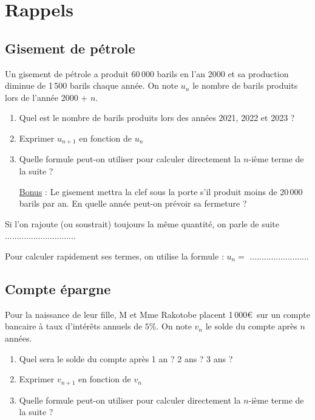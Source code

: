 \documentclass[oneside,12pt]{article}          %
\begin{document}
\section{Rappels}

\subsection{Gisement de pétrole}
Un gisement de pétrole a produit 60\,000 barils en l'an 2000 et sa production diminue de 1\,500 barils chaque année. On note $u_n$ le nombre de barils produits lors de l'année 2000 + $n$.
\begin{enumerate}[align = left]
	\item Quel est le nombre de barils produits lors des années 2021, 2022 et 2023 ?
	\item Exprimer $u_{n+1}$ en fonction de $u_n$
	\item Quelle formule peut-on utiliser pour calculer directement la $n$-ième terme de la suite ?
	\item [\underline{Bonus} :] Le gisement mettra la clef sous la porte s'il produit moins de 20\,000 barils par an. En quelle année peut-on prévoir sa fermeture ?
\end{enumerate}

\begin{tcolorbox}[
    enhanced , arc = 3pt , top = 4mm ,
    fonttitle = \bfseries , title = Je retiens , boxed title style = {arc = 3pt} ,
    coltitle = black , colbacktitle = white ,
    attach boxed title to top left = {xshift = 5mm , yshift = -4mm} ,
	]
	\restoreskip
	
	Si l'on rajoute (ou soustrait) toujours la même quantité, on parle de suite ..............................

	Pour calculer rapidement ses termes, on utilise la formule : $u_n =$ .........................
\end{tcolorbox}


\subsection{Compte épargne}
Pour la naissance de leur fille, M et Mme Rakotobe placent 1\,000\euro\, sur un compte bancaire à taux d'intérêts annuels de $5\%$. On note $v_n$ le solde du compte après $n$ années.
\begin{enumerate}
	\item Quel sera le solde du compte après 1 an ? 2 ans ? 3 ans ?
	\item Exprimer $v_{n+1}$ en fonction de $v_n$
	\item Quelle formule peut-on utiliser pour calculer directement la $n$-ième terme de la suite ?
\end{enumerate}
\end{document}
